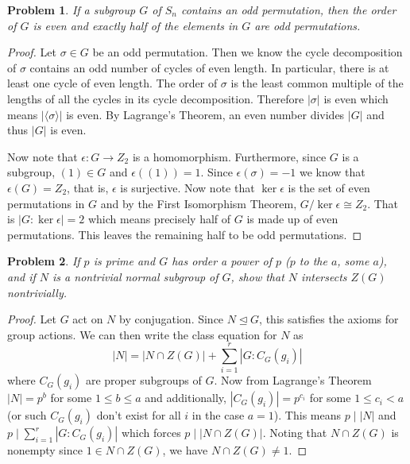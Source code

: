 \documentclass{article}
\newtheorem{problem}{Problem}
\newcommand{\normal}{\unlhd}
\begin{document}

\begin{problem}
If a subgroup $G$ of $S_n$ contains an odd permutation, then the order of $G$ is even and exactly half of the elements in $G$ are odd permutations.
\end{problem}
\begin{proof}
Let $\sigma \in G$ be an odd permutation. Then we know the cycle decomposition of $\sigma$ contains an odd number of cycles of even length. In particular, there is at least one cycle of even length. The order of $\sigma$ is the least common multiple of the lengths of all the cycles in its cycle decomposition. Therefore $|\sigma|$ is even which means $|\langle \sigma \rangle|$ is even. By Lagrange's Theorem, an even number divides $|G|$ and thus $|G|$ is even.

Now note that $\epsilon : G \to Z_2$ is a homomorphism. Furthermore, since $G$ is a subgroup, $(1) \in G$ and $\epsilon((1)) = 1$. Since $\epsilon(\sigma) = -1$ we know that $\epsilon(G) = Z_2$, that is, $\epsilon$ is surjective. Now note that $\ker \epsilon$ is the set of even permutations in $G$ and by the First Isomorphism Theorem, $G/\ker \epsilon \cong Z_2$. That is $|G : \ker \epsilon| = 2$ which means precisely half of $G$ is made up of even permutations. This leaves the remaining half to be odd permutations.
\end{proof}

\begin{problem}
If $p$ is prime and $G$ has order a power of $p$ ($p$ to the $a$, some $a$), and if $N$ is a nontrivial normal subgroup of $G$, show that $N$ intersects $Z(G)$ nontrivially.
\end{problem}
\begin{proof}
Let $G$ act on $N$ by conjugation. Since $N \normal G$, this satisfies the axioms for group actions. We can then write the class equation for $N$ as
\[
|N| = |N \cap Z(G)| + \sum_{i = 1}^{r} |G : C_G(g_i)|
\]
where $C_G(g_i)$ are proper subgroups of $G$. Now from Lagrange's Theorem $|N| = p^b$ for some $1 \leq b \leq a$ and additionally, $|C_G(g_i)| = p^{c_i}$ for some $1 \leq c_i < a$ (or such $C_G(g_i)$ don't exist for all $i$ in the case $a = 1$). This means $p \mid |N|$ and $p \mid \sum_{i=1}^{r} |G : C_G(g_i)|$ which forces $p \mid |N \cap Z(G)|$. Noting that $N \cap Z(G)$ is nonempty since $1 \in N \cap Z(G)$, we have $N \cap Z(G) \neq 1$.
\end{proof}
\end{document}
